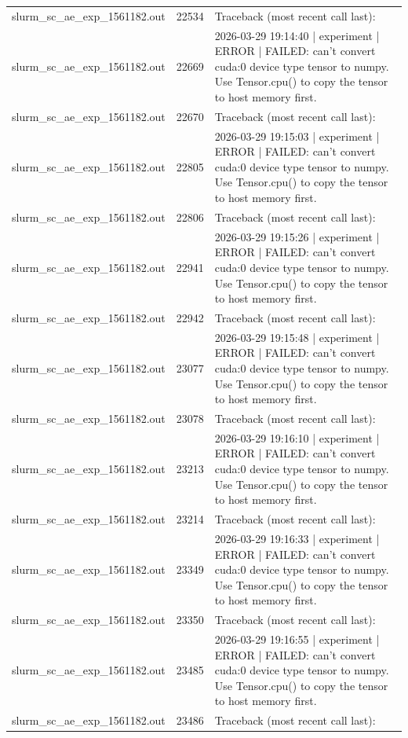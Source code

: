 \begin{tabular}{lrl}
slurm\_sc\_ae\_exp\_1561182.out & 22534 & Traceback (most recent call last): \\
slurm\_sc\_ae\_exp\_1561182.out & 22669 & 2026-03-29 19:14:40 | experiment | ERROR |   FAILED: can't convert cuda:0 device type tensor to numpy. Use Tensor.cpu() to copy the tensor to host memory first. \\
slurm\_sc\_ae\_exp\_1561182.out & 22670 & Traceback (most recent call last): \\
slurm\_sc\_ae\_exp\_1561182.out & 22805 & 2026-03-29 19:15:03 | experiment | ERROR |   FAILED: can't convert cuda:0 device type tensor to numpy. Use Tensor.cpu() to copy the tensor to host memory first. \\
slurm\_sc\_ae\_exp\_1561182.out & 22806 & Traceback (most recent call last): \\
slurm\_sc\_ae\_exp\_1561182.out & 22941 & 2026-03-29 19:15:26 | experiment | ERROR |   FAILED: can't convert cuda:0 device type tensor to numpy. Use Tensor.cpu() to copy the tensor to host memory first. \\
slurm\_sc\_ae\_exp\_1561182.out & 22942 & Traceback (most recent call last): \\
slurm\_sc\_ae\_exp\_1561182.out & 23077 & 2026-03-29 19:15:48 | experiment | ERROR |   FAILED: can't convert cuda:0 device type tensor to numpy. Use Tensor.cpu() to copy the tensor to host memory first. \\
slurm\_sc\_ae\_exp\_1561182.out & 23078 & Traceback (most recent call last): \\
slurm\_sc\_ae\_exp\_1561182.out & 23213 & 2026-03-29 19:16:10 | experiment | ERROR |   FAILED: can't convert cuda:0 device type tensor to numpy. Use Tensor.cpu() to copy the tensor to host memory first. \\
slurm\_sc\_ae\_exp\_1561182.out & 23214 & Traceback (most recent call last): \\
slurm\_sc\_ae\_exp\_1561182.out & 23349 & 2026-03-29 19:16:33 | experiment | ERROR |   FAILED: can't convert cuda:0 device type tensor to numpy. Use Tensor.cpu() to copy the tensor to host memory first. \\
slurm\_sc\_ae\_exp\_1561182.out & 23350 & Traceback (most recent call last): \\
slurm\_sc\_ae\_exp\_1561182.out & 23485 & 2026-03-29 19:16:55 | experiment | ERROR |   FAILED: can't convert cuda:0 device type tensor to numpy. Use Tensor.cpu() to copy the tensor to host memory first. \\
slurm\_sc\_ae\_exp\_1561182.out & 23486 & Traceback (most recent call last): \\

\end{tabular}
